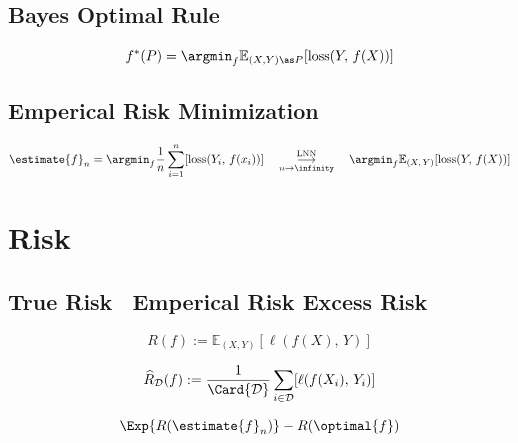\documentclass[18pt,a3paper,landscape, ncols=3]{cheatsheet}
\begin{document}
	\subsection{Bayes Optimal Rule}
		\begin{mdframed}
			\[
				f^{*}(P) = \argmin_{f} \mathbb{E}_{(X,Y) \as P} [\mathrm{loss}(Y,\, f(X))]
			\]
		\end{mdframed}
	\subsection{Emperical Risk Minimization}
		\begin{mdframed}
			\[
				\estimate{f}_{n} = \argmin_{f} \frac{1}{n} \sum_{i=1}^{n} [\mathrm{loss}(Y_i,\, f(x_i))]\quad \overset{\text{LNN}}{\underset{n \rightarrow \infinity}{\longrightarrow}}\quad \argmin_{f} \mathbb{E}_{(X,\,Y)} [\mathrm{loss}(Y,\, f(X))]
			\]
		\end{mdframed}

\section{Risk} \seperator
	\subsection{True Risk \qquad\qquad\qquad\qquad\ Emperical Risk \qquad\qquad\quad Excess Risk}
		\begin{mdframed}
			\begin{minipage}{0.33\textwidth}
				\[
					R(f) := \mathbb{E}_{(X,Y)}[\ell(f(X),\, Y)]
				\]
			\end{minipage}%
			\quad\vrule\quad%
			\begin{minipage}{0.33\textwidth}
				\[
					\widehat{R}_{\mathcal{D}}(f) := \frac{1}{\Card{\mathcal{D}}} \sum_{i \in \mathcal{D}} [\ell(f(X_i),\, Y_i)]
				\]
			\end{minipage}%
			\quad\vrule\quad%
			\begin{minipage}{0.33\textwidth}
				\[
					\Exp{R(\estimate{f}_{n})} - R(\optimal{f})
				\]
			\end{minipage}
		\end{mdframed}
\end{document}
